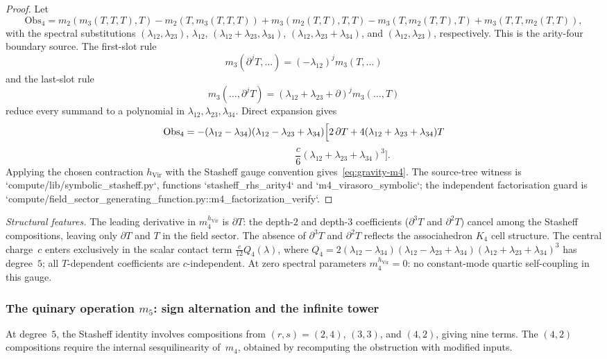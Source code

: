 \begin{proof}
Let
\[
\mathrm{Obs}_4=
m_2(m_3(T,T,T),T)-m_2(T,m_3(T,T,T))
+m_3(m_2(T,T),T,T)
-m_3(T,m_2(T,T),T)
+m_3(T,T,m_2(T,T)),
\]
with the spectral substitutions
\((\lambda_{12},\lambda_{23})\), \(\lambda_{12}\),
\((\lambda_{12}+\lambda_{23},\lambda_{34})\),
\((\lambda_{12},\lambda_{23}+\lambda_{34})\), and
\((\lambda_{12},\lambda_{23})\), respectively.  This is the
arity-four boundary source.  The first-slot rule
\[
m_3(\partial^j T,\ldots)=(-\lambda_{12})^j m_3(T,\ldots)
\]
and the last-slot rule
\[
m_3(\ldots,\partial^jT)
=(\lambda_{12}+\lambda_{23}+\partial)^j m_3(\ldots,T)
\]
reduce every summand to a polynomial in
\(\lambda_{12},\lambda_{23},\lambda_{34}\).  Direct expansion gives
\[
\mathrm{Obs}_4
=-(\lambda_{12}-\lambda_{34})
  (\lambda_{12}-\lambda_{23}+\lambda_{34})
\Bigl[
2\,\partial T+
4(\lambda_{12}+\lambda_{23}+\lambda_{34})T
\]
\[
\hspace{8em}
\frac{c}{6}(\lambda_{12}+\lambda_{23}+\lambda_{34})^3
\Bigr].
\]
Applying the chosen contraction \(h_{\mathrm{Vir}}\) with the Stasheff
gauge convention gives~\eqref{eq:gravity-m4}.  The source-tree witness
is `compute/lib/symbolic_stasheff.py`, functions
`stasheff_rhs_arity4` and `m4_virasoro_symbolic`; the independent
factorisation guard is
`compute/field_sector_generating_function.py::m4_factorization_verify`.
\end{proof}

\noindent
\textit{Structural features.}
The leading derivative in \(m_4^{h_{\mathrm{Vir}}}\) is $\partial T$: the depth-$2$ and
depth-$3$ coefficients ($\partial^3 T$ and $\partial^2 T$) cancel
among the Stasheff compositions, leaving only $\partial T$ and $T$ in
the field sector. The absence of $\partial^3 T$ and $\partial^2 T$
reflects the associahedron $K_4$ cell structure.
The central charge~$c$ enters exclusively in the scalar
contact term $\frac{c}{12}Q_4(\lambda)$, where $Q_4 =
2(\lambda_{12}-\lambda_{34})(\lambda_{12}-\lambda_{23}+\lambda_{34})
(\lambda_{12}+\lambda_{23}+\lambda_{34})^3$ has degree~$5$;
all $T$-dependent coefficients are $c$-independent.
At zero spectral parameters \(m_4^{h_{\mathrm{Vir}}}=0\): no
constant-mode quartic self-coupling in this gauge.

\subsubsection*{The quinary operation $m_5$: sign alternation and
 the infinite tower}

At degree~$5$, the Stasheff identity involves compositions from
$(r,s) = (2,4)$, $(3,3)$, and $(4,2)$, giving nine terms.
The $(4,2)$ compositions require the internal sesquilinearity
of~$m_4$, obtained by recomputing the obstruction with modified inputs.

